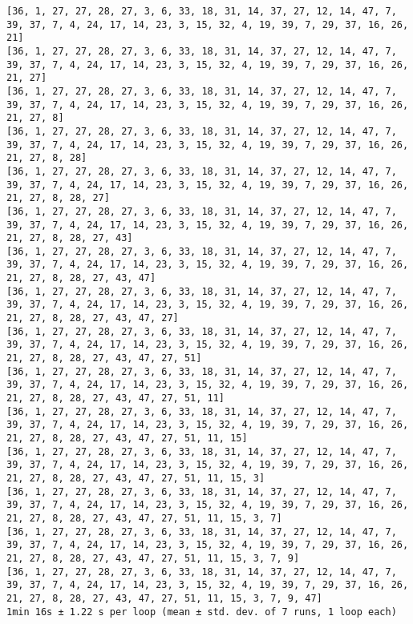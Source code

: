 \documentclass[11pt]{article}
\begin{document}
\begin{Verbatim}[commandchars=\\\{\}]
[36, 1, 27, 27, 28, 27, 3, 6, 33, 18, 31, 14, 37, 27, 12, 14, 47, 7, 39, 37, 7, 4, 24, 17, 14, 23, 3, 15, 32, 4, 19, 39, 7, 29, 37, 16, 26, 21]
[36, 1, 27, 27, 28, 27, 3, 6, 33, 18, 31, 14, 37, 27, 12, 14, 47, 7, 39, 37, 7, 4, 24, 17, 14, 23, 3, 15, 32, 4, 19, 39, 7, 29, 37, 16, 26, 21, 27]
[36, 1, 27, 27, 28, 27, 3, 6, 33, 18, 31, 14, 37, 27, 12, 14, 47, 7, 39, 37, 7, 4, 24, 17, 14, 23, 3, 15, 32, 4, 19, 39, 7, 29, 37, 16, 26, 21, 27, 8]
[36, 1, 27, 27, 28, 27, 3, 6, 33, 18, 31, 14, 37, 27, 12, 14, 47, 7, 39, 37, 7, 4, 24, 17, 14, 23, 3, 15, 32, 4, 19, 39, 7, 29, 37, 16, 26, 21, 27, 8, 28]
[36, 1, 27, 27, 28, 27, 3, 6, 33, 18, 31, 14, 37, 27, 12, 14, 47, 7, 39, 37, 7, 4, 24, 17, 14, 23, 3, 15, 32, 4, 19, 39, 7, 29, 37, 16, 26, 21, 27, 8, 28, 27]
[36, 1, 27, 27, 28, 27, 3, 6, 33, 18, 31, 14, 37, 27, 12, 14, 47, 7, 39, 37, 7, 4, 24, 17, 14, 23, 3, 15, 32, 4, 19, 39, 7, 29, 37, 16, 26, 21, 27, 8, 28, 27, 43]
[36, 1, 27, 27, 28, 27, 3, 6, 33, 18, 31, 14, 37, 27, 12, 14, 47, 7, 39, 37, 7, 4, 24, 17, 14, 23, 3, 15, 32, 4, 19, 39, 7, 29, 37, 16, 26, 21, 27, 8, 28, 27, 43, 47]
[36, 1, 27, 27, 28, 27, 3, 6, 33, 18, 31, 14, 37, 27, 12, 14, 47, 7, 39, 37, 7, 4, 24, 17, 14, 23, 3, 15, 32, 4, 19, 39, 7, 29, 37, 16, 26, 21, 27, 8, 28, 27, 43, 47, 27]
[36, 1, 27, 27, 28, 27, 3, 6, 33, 18, 31, 14, 37, 27, 12, 14, 47, 7, 39, 37, 7, 4, 24, 17, 14, 23, 3, 15, 32, 4, 19, 39, 7, 29, 37, 16, 26, 21, 27, 8, 28, 27, 43, 47, 27, 51]
[36, 1, 27, 27, 28, 27, 3, 6, 33, 18, 31, 14, 37, 27, 12, 14, 47, 7, 39, 37, 7, 4, 24, 17, 14, 23, 3, 15, 32, 4, 19, 39, 7, 29, 37, 16, 26, 21, 27, 8, 28, 27, 43, 47, 27, 51, 11]
[36, 1, 27, 27, 28, 27, 3, 6, 33, 18, 31, 14, 37, 27, 12, 14, 47, 7, 39, 37, 7, 4, 24, 17, 14, 23, 3, 15, 32, 4, 19, 39, 7, 29, 37, 16, 26, 21, 27, 8, 28, 27, 43, 47, 27, 51, 11, 15]
[36, 1, 27, 27, 28, 27, 3, 6, 33, 18, 31, 14, 37, 27, 12, 14, 47, 7, 39, 37, 7, 4, 24, 17, 14, 23, 3, 15, 32, 4, 19, 39, 7, 29, 37, 16, 26, 21, 27, 8, 28, 27, 43, 47, 27, 51, 11, 15, 3]
[36, 1, 27, 27, 28, 27, 3, 6, 33, 18, 31, 14, 37, 27, 12, 14, 47, 7, 39, 37, 7, 4, 24, 17, 14, 23, 3, 15, 32, 4, 19, 39, 7, 29, 37, 16, 26, 21, 27, 8, 28, 27, 43, 47, 27, 51, 11, 15, 3, 7]
[36, 1, 27, 27, 28, 27, 3, 6, 33, 18, 31, 14, 37, 27, 12, 14, 47, 7, 39, 37, 7, 4, 24, 17, 14, 23, 3, 15, 32, 4, 19, 39, 7, 29, 37, 16, 26, 21, 27, 8, 28, 27, 43, 47, 27, 51, 11, 15, 3, 7, 9]
[36, 1, 27, 27, 28, 27, 3, 6, 33, 18, 31, 14, 37, 27, 12, 14, 47, 7, 39, 37, 7, 4, 24, 17, 14, 23, 3, 15, 32, 4, 19, 39, 7, 29, 37, 16, 26, 21, 27, 8, 28, 27, 43, 47, 27, 51, 11, 15, 3, 7, 9, 47]
1min 16s ± 1.22 s per loop (mean ± std. dev. of 7 runs, 1 loop each)

    \end{Verbatim}
\end{document}
